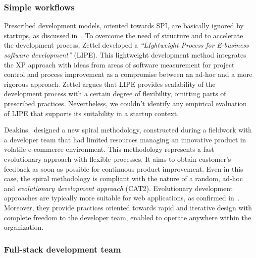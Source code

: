 \documentclass[10pt,journal,letterpaper,compsoc]{IEEEtran}
\begin{document}
\subsubsection{Simple workflows} Prescribed development models, oriented towards
SPI, are basically ignored by startups, as discussed in~\cite{Zettel2001}.
To overcome the need of structure and to accelerate the development process, 
Zettel developed a \textit{``LIghtweight Process for E-business software 
development''} (LIPE).
This lightweight development method integrates the XP approach with ideas from
areas of software measurement for project control and process improvement as a
compromise between an ad-hoc and a more rigorous approach. Zettel argues that
LIPE provides scalability of the development process with a certain degree of
flexibility, omitting parts of prescribed practices. Nevertheless, we couldn't
identify any empirical evaluation of LIPE that supports its suitability in a
startup context.


Deakins~\cite{Deakins2005} designed a new spiral methodology, constructed
during a fieldwork with a developer team that had limited resources managing an
innovative product in volatile e-commerce environment. This methodology
represents a fast evolutionary approach with flexible processes. It aims to
obtain customer's feedback as soon as possible for continuous product
improvement. %
Even in this case, the spiral methodology %
is compliant with the nature of a random, ad-hoc and \textit{evolutionary 
development approach} (CAT2). Evolutionary development approaches are 
typically more suitable for web applications, as confirmed 
in~\cite{Deshpande2001}. Moreover, they provide practices oriented towards rapid 
and iterative design with complete freedom to the developer team, enabled to 
operate anywhere within the organization. 

\subsubsection{Full-stack development team}
\end{document}
